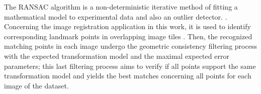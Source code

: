 The RANSAC algorithm is a non-deterministic iterative method of fitting a mathematical model to experimental data and also an outlier detector. \cite{fischler1981random}. Concerning the image registration application in this work, it is used to identify corresponding landmark points in overlapping image tiles \cite{saalfeld2019computational}. Then, the recognized matching points in each image undergo the geometric consistency filtering process with the expected transformation model and the maximal expected error parameters; this last filtering process aims to verify if all points support the same transformation model and yields the best matches concerning all points for each image of the dataset.